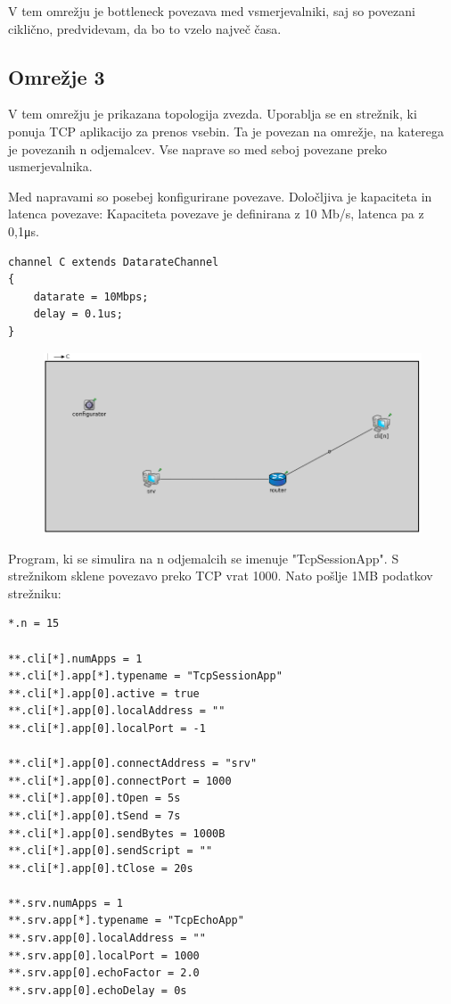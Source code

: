 \documentclass[11pt,a4paper,slovene]{myarticle}
\begin{document}
V tem omrežju je bottleneck povezava med vsmerjevalniki, saj so povezani ciklično, predvidevam, da bo to vzelo največ časa.



\subsection{Omrežje 3}
V tem omrežju je prikazana topologija zvezda. Uporablja se en strežnik, ki ponuja TCP aplikacijo za prenos vsebin. Ta je povezan na omrežje,
na katerega je povezanih n odjemalcev. Vse naprave so med seboj povezane preko usmerjevalnika.

Med napravami so posebej konfigurirane povezave. Določljiva je kapaciteta in latenca povezave:
Kapaciteta povezave je definirana z 10 Mb/s, latenca pa z 0,1μs.
\begin{lstlisting}
channel C extends DatarateChannel
{
    datarate = 10Mbps;
    delay = 0.1us;
}
\end{lstlisting}

\begin{figure}[h]
  \includegraphics[width=\linewidth]{omrezje3.png}
\end{figure}

Program, ki se simulira na n odjemalcih se imenuje "TcpSessionApp". S strežnikom sklene povezavo preko TCP vrat 1000. Nato pošlje 1MB podatkov strežniku:
\begin{lstlisting}[h]
*.n = 15

**.cli[*].numApps = 1
**.cli[*].app[*].typename = "TcpSessionApp"
**.cli[*].app[0].active = true
**.cli[*].app[0].localAddress = ""
**.cli[*].app[0].localPort = -1

**.cli[*].app[0].connectAddress = "srv"
**.cli[*].app[0].connectPort = 1000
**.cli[*].app[0].tOpen = 5s
**.cli[*].app[0].tSend = 7s
**.cli[*].app[0].sendBytes = 1000B
**.cli[*].app[0].sendScript = ""
**.cli[*].app[0].tClose = 20s

**.srv.numApps = 1
**.srv.app[*].typename = "TcpEchoApp"
**.srv.app[0].localAddress = ""
**.srv.app[0].localPort = 1000
**.srv.app[0].echoFactor = 2.0
**.srv.app[0].echoDelay = 0s
\end{lstlisting}
\end{document}
